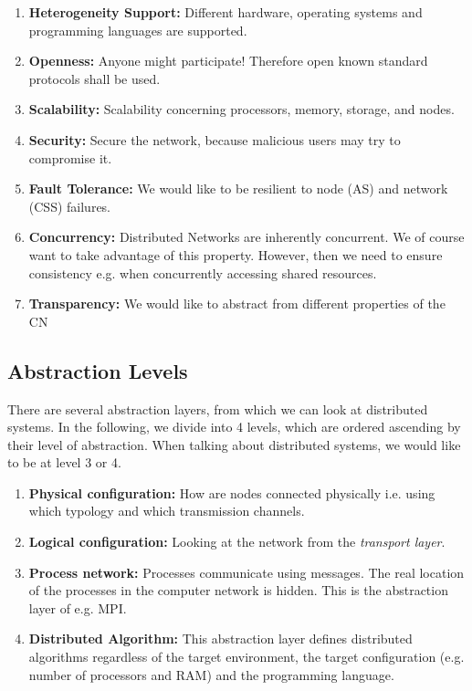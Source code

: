 \begin{enumerate}
    \item \textbf{Heterogeneity Support:} Different hardware, operating systems and programming languages are supported.
    \item \textbf{Openness:} Anyone might participate! Therefore open known standard protocols shall be used.
    \item \textbf{Scalability:} Scalability concerning processors, memory, storage, and nodes.
    \item \textbf{Security:} Secure the network, because malicious users may try to compromise it.
    \item \textbf{Fault Tolerance:} We would like to be resilient to node (\ac{AS}) and network (\ac{CSS}) failures.
    \item \textbf{Concurrency:} Distributed Networks are inherently concurrent. We of course want to take advantage of this property. However, then we need to ensure consistency e.g. when concurrently accessing shared resources.
    \item \textbf{Transparency:} We would like to abstract from different properties of the \ac{CN}
\end{enumerate}

\subsection{Abstraction Levels}

There are several abstraction layers, from which we can look at distributed systems. In the following, we divide into 4 levels, which are ordered ascending by their level of abstraction. When talking about distributed systems, we would like to be at level 3 or 4.

\begin{enumerate}
    \item \textbf{Physical configuration:} How are nodes connected physically i.e. using which typology and which transmission channels.
    \item \textbf{Logical configuration:} Looking at the network from the \textit{transport layer}.
    \item \textbf{Process network:} Processes communicate using messages. The real location of the processes in the computer network is hidden. This is the abstraction layer of e.g. MPI.
    \item \textbf{Distributed Algorithm:} This abstraction layer defines distributed algorithms regardless of the target environment, the target configuration (e.g. number of processors and RAM) and the programming language.
\end{enumerate}

